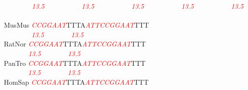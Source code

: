 \documentclass[11pt,twoside,reqno,a4paper]{article}
\begin{document}
{\textcolor{white}{BosTau	}\ \textit{\textcolor{red}{13.5}}\ \ \ \ \ \ \ \ \ \ \ \textit{\textcolor{red}{13.5}}\ \ \ \ \ \ \ \ \ \ \ \textit{\textcolor{red}{13.5}}\ \ \ \ \ \ \ \ \ \ \ \textit{\textcolor{red}{13.5}}\ \ \ \ \ \ \ \ \ \ \ \textit{\textcolor{red}{13.5}}\\
\\
MusMus	\textit{\textcolor{red}{C}}\textit{\textcolor{red}{C}}\textit{\textcolor{red}{G}}\textit{\textcolor{red}{G}}\textit{\textcolor{red}{A}}\textit{\textcolor{red}{A}}\textit{\textcolor{red}{T}}TTTA\textit{\textcolor{red}{A}}\textit{\textcolor{red}{T}}\textit{\textcolor{red}{T}}\textit{\textcolor{red}{C}}\textit{\textcolor{red}{C}}\textit{\textcolor{red}{G}}\textit{\textcolor{red}{G}}\textit{\textcolor{red}{A}}\textit{\textcolor{red}{A}}\textit{\textcolor{red}{T}}TTT\\
\textcolor{white}{MusMus	}\textit{\textcolor{red}{13.5}}\ \ \ \ \ \ \ \ \textit{\textcolor{red}{13.5}}\ \ \ \ \ \ \ \ \ \ \\
RatNor	\textit{\textcolor{red}{C}}\textit{\textcolor{red}{C}}\textit{\textcolor{red}{G}}\textit{\textcolor{red}{G}}\textit{\textcolor{red}{A}}\textit{\textcolor{red}{A}}\textit{\textcolor{red}{T}}TTTA\textit{\textcolor{red}{A}}\textit{\textcolor{red}{T}}\textit{\textcolor{red}{T}}\textit{\textcolor{red}{C}}\textit{\textcolor{red}{C}}\textit{\textcolor{red}{G}}\textit{\textcolor{red}{G}}\textit{\textcolor{red}{A}}\textit{\textcolor{red}{A}}\textit{\textcolor{red}{T}}TTT\\
\textcolor{white}{RatNor	}\textit{\textcolor{red}{13.5}}\ \ \ \ \ \ \ \ \textit{\textcolor{red}{13.5}}\ \ \ \ \ \ \ \ \ \ \\
PanTro	\textit{\textcolor{red}{C}}\textit{\textcolor{red}{C}}\textit{\textcolor{red}{G}}\textit{\textcolor{red}{G}}\textit{\textcolor{red}{A}}\textit{\textcolor{red}{A}}\textit{\textcolor{red}{T}}TTTA\textit{\textcolor{red}{A}}\textit{\textcolor{red}{T}}\textit{\textcolor{red}{T}}\textit{\textcolor{red}{C}}\textit{\textcolor{red}{C}}\textit{\textcolor{red}{G}}\textit{\textcolor{red}{G}}\textit{\textcolor{red}{A}}\textit{\textcolor{red}{A}}\textit{\textcolor{red}{T}}TTT\\
\textcolor{white}{PanTro	}\textit{\textcolor{red}{13.5}}\ \ \ \ \ \ \ \ \textit{\textcolor{red}{13.5}}\ \ \ \ \ \ \ \ \ \ \\
HomSap	\textit{\textcolor{red}{C}}\textit{\textcolor{red}{C}}\textit{\textcolor{red}{G}}\textit{\textcolor{red}{G}}\textit{\textcolor{red}{A}}\textit{\textcolor{red}{A}}\textit{\textcolor{red}{T}}TTTA\textit{\textcolor{red}{A}}\textit{\textcolor{red}{T}}\textit{\textcolor{red}{T}}\textit{\textcolor{red}{C}}\textit{\textcolor{red}{C}}\textit{\textcolor{red}{G}}\textit{\textcolor{red}{G}}\textit{\textcolor{red}{A}}\textit{\textcolor{red}{A}}\textit{\textcolor{red}{T}}TTT\\
}
\end{document}
